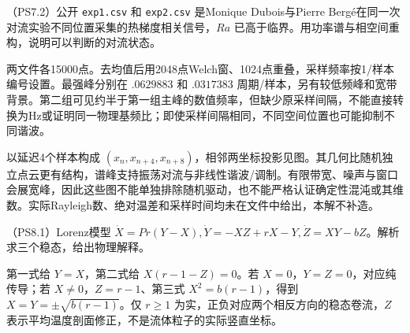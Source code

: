 \begin{exercise}
（PS7.2）公开 \texttt{exp1.csv} 和 \texttt{exp2.csv} 是Monique Dubois与Pierre Bergé在同一次对流实验不同位置采集的热梯度相关信号，$Ra$ 已高于临界。用功率谱与相空间重构，说明可以判断的对流状态。
\end{exercise}
\begin{solution}
两文件各15000点。去均值后用2048点Welch窗、1024点重叠，采样频率按1/样本编号设置。最强峰分别在 $.0629883$ 和 $.0317383$ 周期/样本，另有较低频峰和宽带背景。第二组可见约半于第一组主峰的数值频率，但缺少原采样间隔，不能直接转换为Hz或证明同一物理基频比；即使采样间隔相同，不同空间位置也可能抑制不同谐波。

以延迟4个样本构成 $(x_n,x_{n+4},x_{n+8})$，相邻两坐标投影见图。其几何比随机独立点云更有结构，谱峰支持振荡对流与非线性谐波/调制。有限带宽、噪声与窗口会展宽峰，因此这些图不能单独排除随机驱动，也不能严格认证确定性混沌或其维数。实际Rayleigh数、绝对温差和采样时间均未在文件中给出，本解不补造。
\begin{center}\par
{}
\end{center}
\end{solution}

\begin{exercise}
（PS8.1）Lorenz模型 $\dot X=Pr(Y-X),\dot Y=-XZ+rX-Y,\dot Z=XY-bZ$。解析求三个稳态，给出物理解释。
\end{exercise}
\begin{solution}
第一式给 $Y=X$，第二式给 $X(r-1-Z)=0$。若 $X=0$，$Y=Z=0$，对应纯传导；若 $X\ne0$，$Z=r-1$、第三式 $X^2=b(r-1)$，得到 $X=Y=\pm\sqrt{b(r-1)}$。仅 $r\ge1$ 为实，正负对应两个相反方向的稳态卷流，$Z$ 表示平均温度剖面修正，不是流体粒子的实际竖直坐标。
\end{solution}

